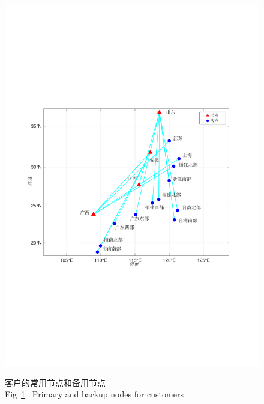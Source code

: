 \begin{figure}[!b]
{		\includegraphics[width=0.47\linewidth]{figures/case_r_3.pdf}}
	\quad
	\caption{客户的常用节点和备用节点\\Fig~\ref{fig:case_backup}~ Primary and backup nodes for customers}
	\label{fig:case_backup}
	\vspace{-0.35cm} %
\end{figure}


